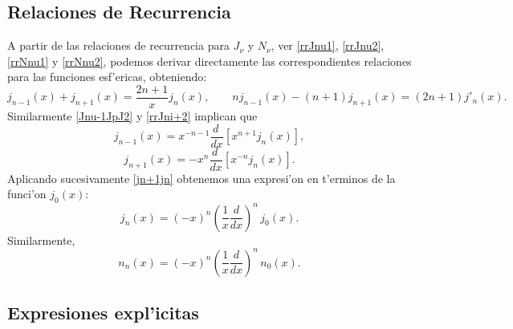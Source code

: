 \subsection{Relaciones de Recurrencia}
A partir de las relaciones de recurrencia para $J_\nu$ y $N_\nu$, ver \eqref{rrJnu1}, \eqref{rrJnu2}, \eqref{rrNnu1} y \eqref{rrNnu2}, podemos derivar directamente las correspondientes relaciones para las funciones esf'ericas, obteniendo:
\begin{equation}
j_{n-1}(x)+j_{n+1}(x)=\frac{2n+1}{x}j_n(x), \qquad nj_{n-1}(x)-(n+1)j_{n+1}(x)=(2n+1)j'_n(x).
\end{equation}
Similarmente \eqref{Jnu-1JpJ2} y \eqref{rrJni+2} implican que
\begin{equation}
j_{n-1}(x)=x^{-n-1}\frac{d\ }{dx}\left[x^{n+1}j_n(x)\right],
\end{equation}
\begin{equation}\label{jn+1jn}
j_{n+1}(x)=-x^{n}\frac{d\ }{dx}\left[x^{-n}j_n(x)\right].
\end{equation}
Aplicando sucesivamente \eqref{jn+1jn} obtenemos una expresi'on en t'erminos de la funci'on $j_0(x)$:
\begin{equation}
j_n(x) = (-x)^n \left(\frac{1}{x}\frac{d}{dx}\right)^n\,j_0(x) .
\end{equation}
Similarmente,
\begin{equation}
n_n(x) = (-x)^n \left(\frac{1}{x}\frac{d}{dx}\right)^n\,n_0(x).
\end{equation}

\subsection{Expresiones expl'icitas}

